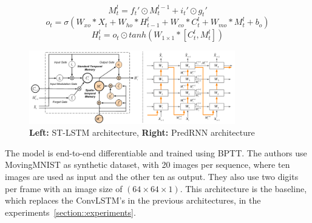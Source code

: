   \begin{equation}
   M_t^l = f_t\prime \odot M_t^{l-1} + i_t\prime \odot g_t\prime
  \end{equation}
  \begin{equation}
   o_t = \sigma(W_{xo} \ast X_t + W_{ho} \ast H_{t-1}^l + W_{co} \ast C_t^l + W_{mo} \ast M_t^l + b_o)
  \end{equation}
  \begin{equation}
   H_t^l = o_t \odot tanh(W_{1 \times 1} \ast [C_t^l, M_t^l])
  \end{equation}
  \begin{figure}[H]
   \includegraphics[width=0.8\textwidth]{../Images/wang.png}
   \centering
   \caption{\textbf{Left:} ST-LSTM architecture, \textbf{Right:} PredRNN architecture \cite{Wang2017}}
   \label{fig:wang_architecture}
  \end{figure}\noindent
  The model is end-to-end differentiable and trained using BPTT. The authors use MovingMNIST as synthetic dataset, with 20 images per sequence, where ten images
  are used as input and the other ten as output. They also use two digits per frame with an image size of $(64 \times 64 \times 1)$.
  This architecture is the baseline, which replaces the ConvLSTM's in the previous architectures, in the experiments~\ref{section::experiments}.